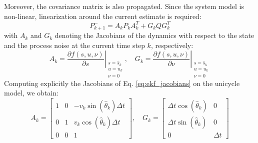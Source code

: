 \documentclass[times, twoside]{zHenriquesLab-StyleBioRxiv}
\begin{document}
Moreover, the covariance matrix is also propagated. Since the system model is non-linear, linearization around the current estimate is required:
\begin{equation}
    P_{k+1}^{-} = A_k P_k A_k^T + G_k Q G_k^T
    \label{eq:ekf_predict_cov}
\end{equation}
with $A_k$ and $G_k$ denoting the Jacobians of the dynamics with respect to the state and the process noise at the current time step $k$, respectively:
\begin{equation}
    A_k = \left. \frac{\partial f(s, u, \nu)}{\partial s} \right|_{\substack{s=\hat{s}_k \\ u=u_k \\ \nu=0}}, \quad 
    G_k = \left. \frac{\partial f(s, u, \nu)}{\partial \nu} \right|_{\substack{s=\hat{s}_k \\ u=u_k \\ \nu=0}}
    \label{eq:ekf_jacobians}
\end{equation}
Computing explicitly the Jacobians of Eq. \ref{eq:ekf_jacobians} on the unicycle model, we obtain:
\begin{equation}
    A_k = \begin{bmatrix} 
    1 & 0 & -v_k \sin(\hat{\theta}_k)\Delta t \\ 
    0 & 1 & v_k \cos(\hat{\theta}_k)\Delta t \\ 
    0 & 0 & 1 
    \end{bmatrix}, \quad
    G_k = \begin{bmatrix} 
    \Delta t \cos(\hat{\theta}_k) & 0 \\ 
    \Delta t \sin(\hat{\theta}_k) & 0 \\ 
    0 & \Delta t 
    \end{bmatrix}
    \label{eq:ekf_matrices}
\end{equation}
\end{document}
